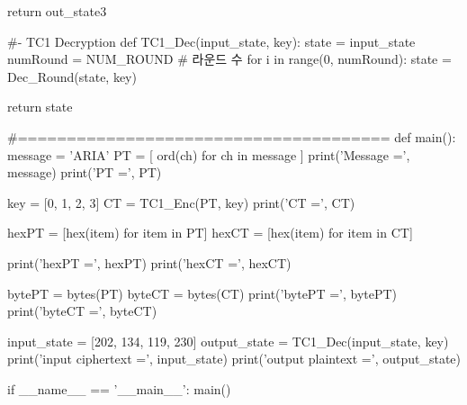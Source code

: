 \begin{python}[TC1Lib.py]
   return out_state3

#- TC1 Decryption
def TC1_Dec(input_state, key):
   state = input_state
   numRound = NUM_ROUND # 라운드 수
   for i in range(0, numRound):
      state = Dec_Round(state, key)

   return state
   
#======================================
def main():
   message = 'ARIA'
   PT = [ ord(ch) for ch in message ]
   print('Message =', message)
   print('PT =', PT)
   
   key = [0, 1, 2, 3]
   CT = TC1_Enc(PT, key)
   print('CT =', CT)
   
   hexPT = [hex(item) for item in PT]
   hexCT = [hex(item) for item in CT]
   
   print('hexPT =', hexPT)
   print('hexCT =', hexCT)
   
   bytePT = bytes(PT)
   byteCT = bytes(CT)
   print('bytePT =', bytePT)
   print('byteCT =', byteCT)

   input_state = [202, 134, 119, 230]
   output_state = TC1_Dec(input_state, key)
   print('input ciphertext =', input_state)
   print('output plaintext =', output_state)

if __name__ == '__main__':
   main()
\end{python}


